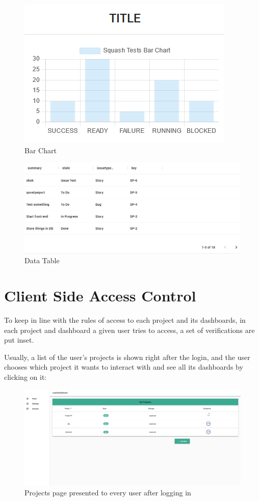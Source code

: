 \documentclass[a4paper,twoside,10pt]{report}
\begin{document}
\begin{figure}[h!]
\center
  \includegraphics[]{bar-chart.png}
\caption{Bar Chart}
\end{figure}

\begin{figure}[h!]
\center
  \includegraphics[width=\textwidth]{data-table.png}
\caption{Data Table}
\end{figure}

\section{Client Side Access Control}
To keep in line with the rules of access to each project and its dashboards, in each project and dashboard a given user tries to access, a set of verifications are put inset.

Usually, a list of the user's projects is shown right after the login, and the user chooses which project it wants to interact with and see all its dashboards by clicking on it:
\begin{figure}[h!]
\center
  \includegraphics[width=\textwidth]{projectsPage.png}
\caption{Projects page presented to every user after logging in}
\end{figure}
\end{document}
